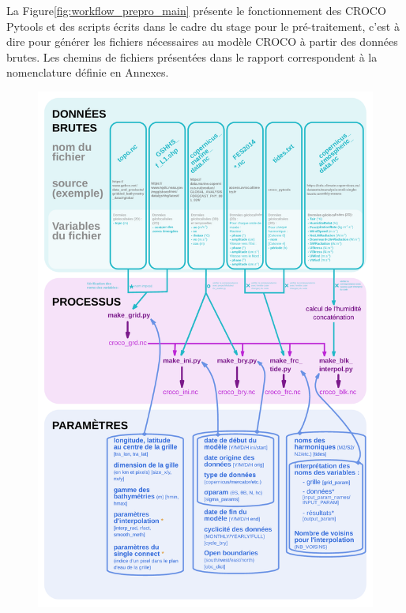 \documentclass[10pt,a4paper,titlepage]{article}
\begin{document}
La Figure\ref{fig:workflow_prepro_main} présente le fonctionnement des CROCO Pytools et des scripts écrits dans le cadre du stage pour le pré-traitement, c'est à dire pour générer les fichiers nécessaires au modèle CROCO à partir des données brutes.
Les chemins de fichiers présentées dans le rapport correspondent à la nomenclature définie en Annexes.
\begin{figure}[h]
    \begin{center}
        \includegraphics[scale=0.35]{../images/workflow/graphe_data_process_mere.pdf}

\end{center}
\end{figure}
\end{document}
